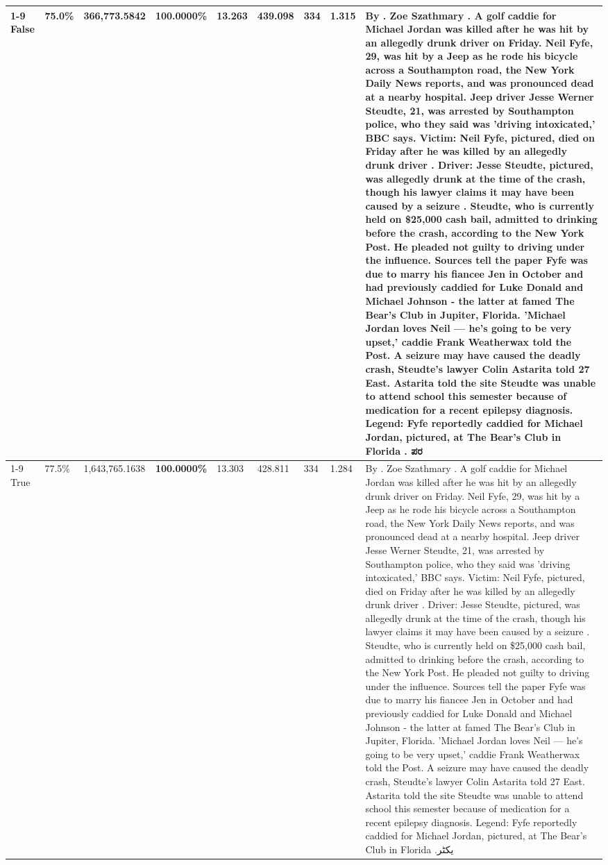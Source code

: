 \begin{table}[H]
\begin{tabular}{lllrlllll}
\cline{1-9}
False & 75.0\% & 366,773.5842 & \bfseries \color{red} 100.0000\% & 13.263 & 439.098 & 334 & 1.315 & By . Zoe Szathmary . A golf caddie for Michael Jordan was killed after he was hit by an allegedly drunk driver on Friday. Neil Fyfe, 29, was hit by a Jeep as he rode his bicycle across a Southampton road, the New York Daily News reports, and was pronounced dead at a nearby hospital. Jeep driver Jesse Werner Steudte, 21, was arrested by Southampton police, who they said was 'driving intoxicated,' BBC says. Victim: Neil Fyfe, pictured, died on Friday after he was killed by an allegedly drunk driver . Driver: Jesse Steudte, pictured, was allegedly drunk at the time of the crash, though his lawyer claims it may have been caused by a seizure . Steudte, who is currently held on \$25,000 cash bail, admitted to drinking before the crash, according to the New York Post. He pleaded not guilty to driving under the influence. Sources tell the paper Fyfe was due to marry his fiancee Jen in October and had previously caddied for Luke Donald and Michael Johnson - the latter at famed The Bear's Club in Jupiter, Florida. 'Michael Jordan loves Neil — he’s going to be very upset,' caddie Frank Weatherwax told the Post. A seizure may have caused the deadly crash, Steudte's lawyer Colin Astarita told 27 East. Astarita told the site Steudte was unable to attend school this semester because of medication for a recent epilepsy diagnosis. Legend: Fyfe reportedly caddied for Michael Jordan, pictured, at The Bear's Club in Florida . ಪರ \\
\cline{1-9}
True & 77.5\% & 1,643,765.1638 & \bfseries \color{red} 100.0000\% & 13.303 & 428.811 & 334 & 1.284 & By . Zoe Szathmary . A golf caddie for Michael Jordan was killed after he was hit by an allegedly drunk driver on Friday. Neil Fyfe, 29, was hit by a Jeep as he rode his bicycle across a Southampton road, the New York Daily News reports, and was pronounced dead at a nearby hospital. Jeep driver Jesse Werner Steudte, 21, was arrested by Southampton police, who they said was 'driving intoxicated,' BBC says. Victim: Neil Fyfe, pictured, died on Friday after he was killed by an allegedly drunk driver . Driver: Jesse Steudte, pictured, was allegedly drunk at the time of the crash, though his lawyer claims it may have been caused by a seizure . Steudte, who is currently held on \$25,000 cash bail, admitted to drinking before the crash, according to the New York Post. He pleaded not guilty to driving under the influence. Sources tell the paper Fyfe was due to marry his fiancee Jen in October and had previously caddied for Luke Donald and Michael Johnson - the latter at famed The Bear's Club in Jupiter, Florida. 'Michael Jordan loves Neil — he’s going to be very upset,' caddie Frank Weatherwax told the Post. A seizure may have caused the deadly crash, Steudte's lawyer Colin Astarita told 27 East. Astarita told the site Steudte was unable to attend school this semester because of medication for a recent epilepsy diagnosis. Legend: Fyfe reportedly caddied for Michael Jordan, pictured, at The Bear's Club in Florida .یکٹر \\

\end{tabular}
\end{table}
